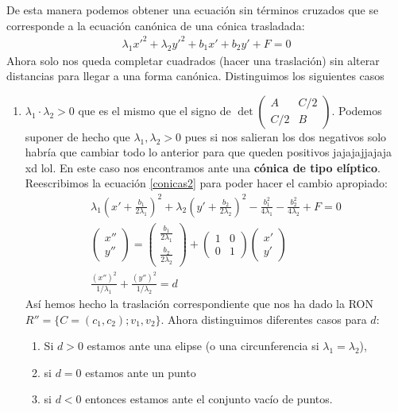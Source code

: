 \documentclass[14pt]{book}
\begin{document}
De esta manera podemos obtener una ecuación sin términos cruzados que se corresponde a la ecuación canónica de una cónica trasladada:
\begin{align}
	\label{conicas2}
	\lambda_1 x'^2 + \lambda_2 y'^2 + b_1x' + b_2y' + F = 0
\end{align}
Ahora solo nos queda completar cuadrados (hacer una traslación) sin alterar distancias para llegar a una forma canónica. Distinguimos los siguientes casos
\begin{enumerate}
	\item $\lambda_1 \cdot \lambda_2 > 0$ que es el mismo que el signo de $\det\left(\begin{array}{cc}
	A & C/2 \\ C/2 & B
	\end{array}\right)$. Podemos suponer de hecho que $\lambda_1, \lambda_2 > 0$ pues si nos salieran los dos negativos solo habría que cambiar todo lo anterior para que queden positivos jajajajjajaja xd lol. En este caso nos encontramos ante una \textbf{cónica de tipo elíptico}. Reescribimos la ecuación \eqref{conicas2} para poder hacer el cambio apropiado:
	\begin{align*}
		\lambda_1(x' + \frac{b_1}{2\lambda_1})^2 + \lambda_2(y' + \frac{b_2}{2\lambda_2})^2 - \frac{b_1^2}{4\lambda_1} - \frac{b_2^2}{4\lambda_2} + F = 0 \\
		\left(\begin{array}{c}
		x'' \\ y''
		\end{array}\right) = \left(\begin{array}{c}
		\frac{b_1}{2\lambda_1} \\ \frac{b_2}{2\lambda_2}
		\end{array}\right) + \left(\begin{array}{cc}
		1 & 0 \\ 0 & 1
		\end{array}\right)\left(\begin{array}{c}
		x' \\ y'
		\end{array}\right) \\
		\frac{(x'')^2}{1/\lambda_1} + \frac{(y'')^2}{1/\lambda_2} = d
	\end{align*}
	Así hemos hecho la traslación correspondiente que nos ha dado la RON $R'' = \{C= (c_1, c_2); v_1, v_2\}$. Ahora distinguimos diferentes casos para $d$:
	\begin{enumerate}
		\item Si $d > 0$ estamos ante una elipse (o una circunferencia si $\lambda_1 = \lambda_2$),
		\item si $d = 0$ estamos ante un punto
		\item si $d < 0$ entonces estamos ante el conjunto vacío de puntos.
	\end{enumerate}


\end{enumerate}
\end{document}
